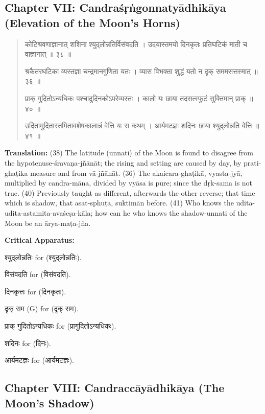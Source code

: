 \documentclass[11pt,a4paper]{article}
\newcommand{\dev}[1]{{\devanagarifont #1}}
\newenvironment{sanskritverse}{%
  \begin{quote}%
  \devanagarifont%
  \setlength{\leftmargin}{2em}%
}{\end{quote}}
\newenvironment{variants}{%
  \small%
  \color{varecolor}%
  \list{}{\leftmargin=2em\itemindent=-1em}%
}{\endlist}
\begin{document}
\subsection*{Chapter VII: Candraśṛṅgonnatyādhikāya (Elevation of the Moon's Horns)}

\begin{sanskritverse}
\dev{कोटिश्रवणाज्ञानात् शशिना श्युद्लोन्नतिर्विसंवदति} ।
\dev{उदयास्तमयो दिनकृतः प्रतिघटिकं माती च वाज्ञानात् ॥ ३८ ॥}

\dev{श्रकैतरघटिका व्यस्तज्ञा चन्द्रमानगुणिता यतः} ।
\dev{व्यास विभक्ता शुद्धं यतो न दृक् सममसत्तस्मात् ॥ ३६ ॥}

\dev{प्राक् गुदितोऽन्यधिकः पश्चादुदिनकोऽपरेव्यस्तः} ।
\dev{कालो यः छाया तदसत्स्फुटं सुक्तिमान् प्राक् ॥ ४० ॥}

\dev{उदितामुदितास्तमितावशेषकालान्नं वेत्ति यः स कथम्} ।
\dev{आर्यमटज्ञः शदिनः छाया श्युद्लोन्नति वेत्ति ॥ ४१ ॥}
\end{sanskritverse}

\textbf{Translation:} (38) The latitude (unnati) of the Moon is found to disagree 
from the hypotenuse-śravaṇa-jñānāt; the rising and setting are caused by day, 
by prati-ghaṭika measure and from vā-jñānāt. (36) The akaicara-ghaṭikā, vyasta-jyā, 
multiplied by candra-māna, divided by vyāsa is pure; since the dṛk-sama is not 
true. (40) Previously taught as different, afterwards the other reverse; that 
time which is shadow, that asat-sphuṭa, suktimān before. (41) Who knows the 
udita-udita-astamita-avaśeṣa-kāla; how can he who knows the shadow-unnati of 
the Moon be an ārya-maṭa-jña.

\textcolor{varecolor}{\textbf{Critical Apparatus:}}
\begin{variants}
\item[38.1] \dev{श्युद्लोन्नतिः} \dev{for} (\dev{श्युद्लोन्नतिः}).
\item[38.2] \dev{विसंवदति} \dev{for} (\dev{विसंवदति}).
\item[38.3] \dev{दिनकृत्तः} \dev{for} (\dev{दिनकृतः}).
\item[36.1] \dev{दृक् सम} (G) \dev{for} (\dev{दृक् सम}).
\item[40.1] \dev{प्राक् गुदितोऽन्यधिकः} \dev{for} (\dev{प्रागुदितोऽन्यधिकः}).
\item[41.1] \dev{शदिनः} \dev{for} (\dev{दिनः}).
\item[41.2] \dev{आर्यमटज्ञः} \dev{for} (\dev{आर्यमटज्ञः}).
\end{variants}

\subsection*{Chapter VIII: Candraccāyādhikāya (The Moon's Shadow)}
\end{document}
